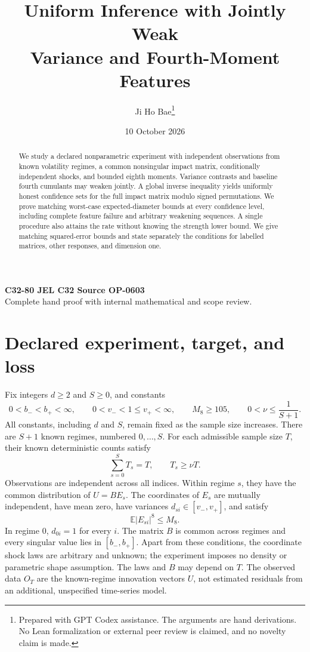 \documentclass[11pt,a4paper]{article}
\title{Uniform Inference with Jointly Weak\\
Variance and Fourth-Moment Features}
\author{Ji Ho Bae\thanks{Prepared with GPT Codex assistance. The arguments are hand derivations. No Lean formalization or external peer review is claimed, and no novelty claim is made.}}
\date{10 October 2026}
\numberwithin{equation}{section}
\newcommand{\E}{\mathbb E}
\begin{document}
\maketitle
\begin{center}
\small
\textbf{C32-80 \quad JEL C32 \quad Source OP-0603}\\
Complete hand proof with internal mathematical and scope review.
\end{center}
\begin{abstract}
We study a declared nonparametric experiment with independent observations
from known volatility regimes, a common nonsingular impact matrix,
conditionally independent shocks, and bounded eighth moments.
Variance contrasts and baseline fourth cumulants may weaken jointly.
A global inverse inequality yields uniformly honest confidence sets for
the full impact matrix modulo signed permutations. We prove matching
worst-case expected-diameter bounds at every confidence level, including
complete feature failure and arbitrary weakening sequences. A single
procedure also attains the rate without knowing the strength lower bound.
We give matching squared-error bounds and state separately the conditions
for labelled matrices, other responses, and dimension one.
\end{abstract}

\section{Declared experiment, target, and loss}\label{sec:model}
Fix integers \(d\ge2\) and \(S\ge0\), and constants
\[
 0<b_-<b_+<\infty,\qquad
 0<v_-<1\le v_+<\infty,\qquad
 M_8\ge105,\qquad 0<\nu\le\frac1{S+1}.
\]
All constants, including \(d\) and \(S\), remain fixed as the sample size
increases. There are \(S+1\) known regimes, numbered \(0,\ldots,S\).
For each admissible sample size \(T\), their known deterministic counts
satisfy
\[
 \sum_{s=0}^S T_s=T,\qquad T_s\ge\nu T.
\]
Observations are independent across all indices. Within regime \(s\),
they have the common distribution of \(U=BE_s\).
The coordinates of \(E_s\) are mutually independent, have mean zero,
have variances \(d_{si}\in[v_-,v_+]\), and satisfy
\[
 \E|E_{si}|^8\le M_8.
\]
In regime \(0\), \(d_{0i}=1\) for every \(i\). The matrix \(B\) is common
across regimes and every singular value lies in \([b_-,b_+]\).
Apart from these conditions, the coordinate shock laws are arbitrary and
unknown; the experiment imposes no density or parametric shape assumption.
The laws and \(B\) may depend on \(T\). The observed data \(O_T\) are the
known-regime innovation vectors \(U\), not estimated residuals from an
additional, unspecified time-series model.
\end{document}
